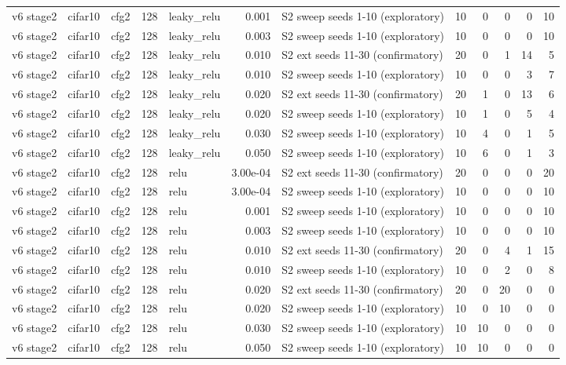 \begin{table}[htbp]
{\begin{tabular}{@{}lllrlrlrrrrr@{}}
v6 stage2 & cifar10 & cfg2 & 128 & leaky\_relu & 0.001 & S2 sweep seeds 1-10 (exploratory) & 10 & 0 & 0 & 0 & 10 \\
v6 stage2 & cifar10 & cfg2 & 128 & leaky\_relu & 0.003 & S2 sweep seeds 1-10 (exploratory) & 10 & 0 & 0 & 0 & 10 \\
v6 stage2 & cifar10 & cfg2 & 128 & leaky\_relu & 0.010 & S2 ext seeds 11-30 (confirmatory) & 20 & 0 & 1 & 14 & 5 \\
v6 stage2 & cifar10 & cfg2 & 128 & leaky\_relu & 0.010 & S2 sweep seeds 1-10 (exploratory) & 10 & 0 & 0 & 3 & 7 \\
v6 stage2 & cifar10 & cfg2 & 128 & leaky\_relu & 0.020 & S2 ext seeds 11-30 (confirmatory) & 20 & 1 & 0 & 13 & 6 \\
v6 stage2 & cifar10 & cfg2 & 128 & leaky\_relu & 0.020 & S2 sweep seeds 1-10 (exploratory) & 10 & 1 & 0 & 5 & 4 \\
v6 stage2 & cifar10 & cfg2 & 128 & leaky\_relu & 0.030 & S2 sweep seeds 1-10 (exploratory) & 10 & 4 & 0 & 1 & 5 \\
v6 stage2 & cifar10 & cfg2 & 128 & leaky\_relu & 0.050 & S2 sweep seeds 1-10 (exploratory) & 10 & 6 & 0 & 1 & 3 \\
v6 stage2 & cifar10 & cfg2 & 128 & relu & 3.00e-04 & S2 ext seeds 11-30 (confirmatory) & 20 & 0 & 0 & 0 & 20 \\
v6 stage2 & cifar10 & cfg2 & 128 & relu & 3.00e-04 & S2 sweep seeds 1-10 (exploratory) & 10 & 0 & 0 & 0 & 10 \\
v6 stage2 & cifar10 & cfg2 & 128 & relu & 0.001 & S2 sweep seeds 1-10 (exploratory) & 10 & 0 & 0 & 0 & 10 \\
v6 stage2 & cifar10 & cfg2 & 128 & relu & 0.003 & S2 sweep seeds 1-10 (exploratory) & 10 & 0 & 0 & 0 & 10 \\
v6 stage2 & cifar10 & cfg2 & 128 & relu & 0.010 & S2 ext seeds 11-30 (confirmatory) & 20 & 0 & 4 & 1 & 15 \\
v6 stage2 & cifar10 & cfg2 & 128 & relu & 0.010 & S2 sweep seeds 1-10 (exploratory) & 10 & 0 & 2 & 0 & 8 \\
v6 stage2 & cifar10 & cfg2 & 128 & relu & 0.020 & S2 ext seeds 11-30 (confirmatory) & 20 & 0 & 20 & 0 & 0 \\
v6 stage2 & cifar10 & cfg2 & 128 & relu & 0.020 & S2 sweep seeds 1-10 (exploratory) & 10 & 0 & 10 & 0 & 0 \\
v6 stage2 & cifar10 & cfg2 & 128 & relu & 0.030 & S2 sweep seeds 1-10 (exploratory) & 10 & 10 & 0 & 0 & 0 \\
v6 stage2 & cifar10 & cfg2 & 128 & relu & 0.050 & S2 sweep seeds 1-10 (exploratory) & 10 & 10 & 0 & 0 & 0 \\

\end{tabular}}
\end{table}
